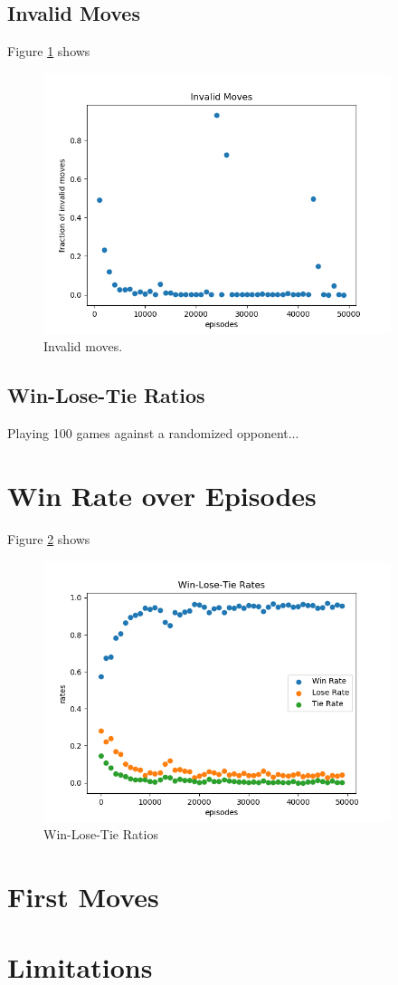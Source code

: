 \documentclass{article}
\begin{document}
   \subsection{Invalid Moves}
   Figure \ref{fig:5c} shows
      \begin{figure}[h] \centering
          \includegraphics[width=4in]{resources/part5c}
          \caption{ Invalid moves. }
          \label{fig:5c}
       \end{figure}

   \subsection{Win-Lose-Tie Ratios}
   Playing 100 games against a randomized opponent...


   \section{Win Rate over Episodes}
   Figure \ref{fig:6} shows
      \begin{figure}[h] \centering
          \includegraphics[width=4in]{resources/part6}
          \caption{ Win-Lose-Tie Ratios }
          \label{fig:6}
       \end{figure}


   \section{First Moves}
   \section{Limitations}
\end{document}
